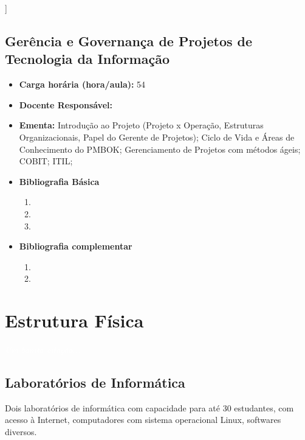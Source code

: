 \documentclass[11pt,fleqn]{book} %
\begin{document}
]

\newpage
\section{Gerência e Governança de Projetos de Tecnologia da Informação}\label{disc:govproj}

\begin{itemize}
	\item \textbf{Carga horária (hora/aula):} 54
	\item \textbf{Docente Responsável:}~
	\item \textbf{Ementa:} 
	Introdução ao Projeto (Projeto x Operação, Estruturas Organizacionais, Papel do Gerente de Projetos);
	Ciclo de Vida e Áreas de Conhecimento do PMBOK;
	Gerenciamento de Projetos com métodos ágeis;
	COBIT;
	ITIL;
    
	\item \textbf{Bibliografia Básica}
	\begin{enumerate}
		\item 
		\item 
		\item 
	\end{enumerate}
	\item \textbf{Bibliografia complementar}
	\begin{enumerate}
		\item 
		\item
	\end{enumerate} 	
\end{itemize}


\chapter{Estrutura Física}\label{estrutura}
\vspace{6em}
\begin{flushright}
	\textit{\textcolor{white}{Um bonita citação...}}
\end{flushright}
\vspace{12em}

\section{Laboratórios de Informática}
Dois laboratórios de informática com capacidade para até 30 estudantes, com acesso à Internet, computadores com sistema operacional Linux, softwares diversos.
\end{document}
